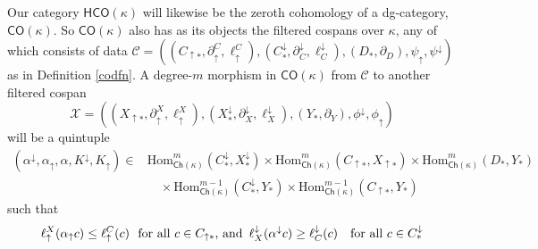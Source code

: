 \documentclass[11pt]{amsart}
\theoremstyle{definition}
\theoremstyle{remark}
\numberwithin{equation}{section}
\begin{document}
Our category $\mathsf{HCO}(\kappa)$ will likewise be the zeroth cohomology of a dg-category, $\mathsf{CO}(\kappa)$.  So $\mathsf{CO}(\kappa)$  also has as its objects the filtered cospans over $\kappa$, any of which consists of data $\mathcal{C}=\left((C_{\uparrow *},\partial_{\uparrow}^C,\ell_{\uparrow}^C),(C^{\downarrow}_{*},\partial^{\downarrow}_C,\ell^{\downarrow}_C),(D_*,\partial_D),\psi_{\uparrow},\psi^{\downarrow}\right)$ as in Definition \ref{codfn}. %
A degree-$m$ morphism in $\mathsf{CO}(\kappa)$ from $\mathcal{C}$ to another filtered cospan \[\mathcal{X}=\left((X_{\uparrow *},\partial_{\uparrow}^X,\ell_{\uparrow}^{X}),(X^{\downarrow}_{*},\partial^{\downarrow}_{X},\ell^{\downarrow}_{X}),(Y_*,\partial_Y),\phi^{\downarrow},\phi_{\uparrow}\right)\] will be a quintuple \begin{align}\label{quint} \left(\alpha^{\downarrow},\alpha_{\uparrow},\alpha,K^{\downarrow},K_{\uparrow}\right)\in & \mathrm{Hom}_{\mathsf{Ch}(\kappa)}^m(C^{\downarrow}_{*},X^{\downarrow}_{*})\times \mathrm{Hom}_{\mathsf{Ch}(\kappa)}^m(C_{\uparrow*},X_{\uparrow*})\times\mathrm{Hom}_{\mathsf{Ch}(\kappa)}^m(D_{*},Y_{*})\\ & \quad \times \mathrm{Hom}_{\mathsf{Ch}(\kappa)}^{m-1}(C^{\downarrow}_{*},Y_{*})\times\mathrm{Hom}_{\mathsf{Ch}(\kappa)}^{m-1}(C_{\uparrow*},Y_{*}) \nonumber \end{align}
such that \begin{equation}\label{filtpres} \ell_{\uparrow}^{X}(\alpha_{\uparrow}c)\leq \ell_{\uparrow}^{C}(c)  \mbox{\,\, for all $c\in C_{\uparrow *}$, and\,\,\,}  \ell^{\downarrow}_{X}(\alpha^{\downarrow}c)\geq \ell^{\downarrow}_{C}(c) \quad \mbox{for all $c\in C^{\downarrow}_{*}$}\end{equation}
\end{document}
